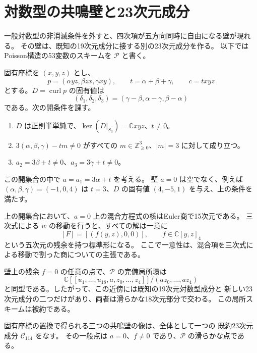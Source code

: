 \section{対数型の共鳴壁と23次元成分}
\label{subsec:resonance23-v32}

一般対数型の非消滅条件を外すと、四次項が五方向同時に自由になる壁が現れる。
その壁は、既知の19次元成分に接する別の23次元成分を作る。
以下ではPoisson構造の53変数のスキームを $\mathscr P$ と書く。

固有座標を $(x,y,z)$ とし、
\[
 p=(\alpha yz,\beta zx,\gamma xy),\qquad
 t=\alpha+\beta+\gamma,\qquad c=txyz
\]
とする。$D=\operatorname{curl}p$ の固有値は
\[
 (\delta_1,\delta_2,\delta_3)
 =(\gamma-\beta,\alpha-\gamma,\beta-\alpha)
\]
である。次の開条件を課す。
\begin{enumerate}
\item $D$ は正則半単純で、$\ker(D|_{S_3})=\mathbb Cxyz$、$t\neq0$。
\item $3(\alpha,\beta,\gamma)-tm\neq0$ がすべての
      $m\in\mathbb Z_{\geq0}^3$、$|m|=3$ に対して成り立つ。
\item $a_2=3\beta+t\neq0$、$a_3=3\gamma+t\neq0$。
\end{enumerate}
この開集合の中で $a=a_1=3\alpha+t$ を考える。
壁 $a=0$ は空でなく、例えば $(\alpha,\beta,\gamma)=(-1,0,4)$ は
$t=3$、$D$ の固有値 $(4,-5,1)$ を与え、上の条件を満たす。

\begin{theorem}
\label{thm:resonance23-v32}
上の開集合において、$a=0$ 上の混合方程式の核はEuler商で15次元である。
三次式による $w$ の移動を行うと、すべての解は一意に
\[
 [F]=[(f(y,z),0,0)],\qquad f\in\mathbb C[y,z]_4
\]
という五次元の残余を持つ標準形になる。
ここで一意性は、混合項を三次式による移動で割った商についての主張である。

壁上の残余 $f=0$ の任意の点で、$\mathscr P$ の完備局所環は
\[
 \mathbb C[[u_1,\ldots,u_{18},a,z_0,\ldots,z_4]]
       /(az_0,\ldots,az_4)
\]
と同型である。したがって、この近傍には既知の19次元対数型成分と
新しい23次元成分の二つだけがあり、両者は滑らかな18次元部分で交わる。
この局所スキームは被約である。

固有座標の置換で得られる三つの共鳴壁の像は、全体として一つの
既約23次元成分 $\mathscr C_{114}$ をなす。
その一般点は $a=0$、$f\neq0$ であり、$\mathscr P$ の滑らかな点である。
\end{theorem}

